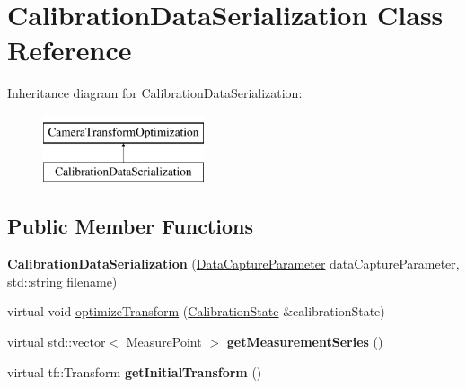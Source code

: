 \hypertarget{classCalibrationDataSerialization}{\section{\-Calibration\-Data\-Serialization \-Class \-Reference}
\label{classCalibrationDataSerialization}
}
\-Inheritance diagram for \-Calibration\-Data\-Serialization\-:\begin{figure}[H]
\begin{center}
\leavevmode
\includegraphics[height=2.000000cm]{classCalibrationDataSerialization}
\end{center}
\end{figure}
\subsection*{\-Public \-Member \-Functions}
\begin{DoxyCompactItemize}
\item 
\hypertarget{classCalibrationDataSerialization_abcc65d6c8575184b85167bb078e4e4df}{{\bfseries \-Calibration\-Data\-Serialization} (\hyperlink{classDataCaptureParameter}{\-Data\-Capture\-Parameter} data\-Capture\-Parameter, std\-::string filename)}\label{classCalibrationDataSerialization_abcc65d6c8575184b85167bb078e4e4df}

\item 
virtual void \hyperlink{classCalibrationDataSerialization_a7e7db9387843500002e908cb54a0b5ea}{optimize\-Transform} (\hyperlink{classCalibrationState}{\-Calibration\-State} \&calibration\-State)
\item 
\hypertarget{classCalibrationDataSerialization_ad3475e1d828cfd3a32f8de89b85f6a25}{virtual std\-::vector$<$ \hyperlink{classCameraMeasurePoint}{\-Measure\-Point} $>$ {\bfseries get\-Measurement\-Series} ()}\label{classCalibrationDataSerialization_ad3475e1d828cfd3a32f8de89b85f6a25}

\item 
\hypertarget{classCalibrationDataSerialization_afd543f2bf35bda0f5b2b6017df2374d3}{virtual tf\-::\-Transform {\bfseries get\-Initial\-Transform} ()}\label{classCalibrationDataSerialization_afd543f2bf35bda0f5b2b6017df2374d3}

\end{DoxyCompactItemize}
